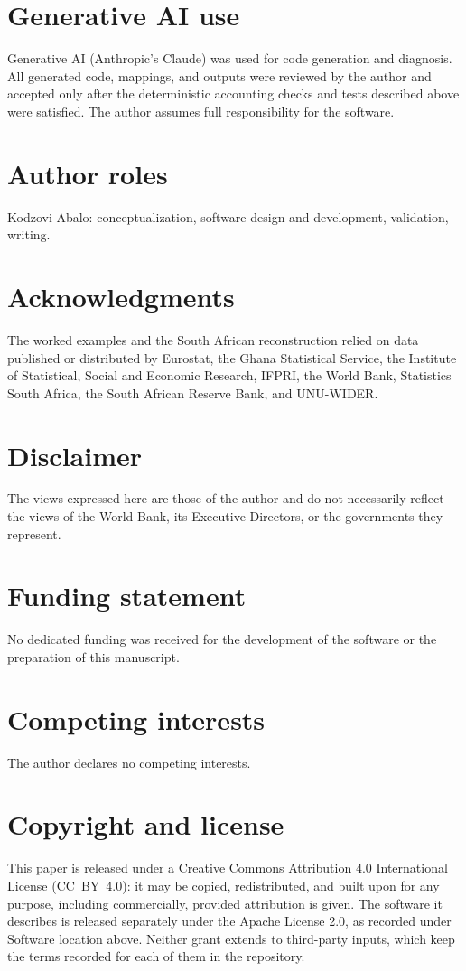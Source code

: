 \documentclass[11pt,a4paper]{article}
\begin{document}
\section*{Generative AI use}
Generative AI (Anthropic's Claude) was used for code generation and
diagnosis. All generated code, mappings, and outputs were reviewed by the
author and accepted only after the deterministic accounting checks and
tests described above were satisfied. The author assumes full
responsibility for the software.

\section*{Author roles}
Kodzovi Abalo: conceptualization, software design and development,
validation, writing.

\section*{Acknowledgments}
The worked examples and the South African reconstruction relied on data
published or distributed by Eurostat, the Ghana Statistical Service, the
Institute of Statistical, Social and Economic Research, IFPRI, the World
Bank, Statistics South Africa, the South African Reserve Bank, and
UNU-WIDER.

\section*{Disclaimer}
The views expressed here are those of the author and do not necessarily
reflect the views of the World Bank, its Executive Directors, or the
governments they represent.

\section*{Funding statement}
No dedicated funding was received for the development of the software or
the preparation of this manuscript.

\section*{Competing interests}
The author declares no competing interests.

\section*{Copyright and license}
This paper is released under a Creative Commons Attribution 4.0
International License (CC~BY~4.0): it may be copied, redistributed, and
built upon for any purpose, including commercially, provided attribution
is given. The software it describes is released separately under the
Apache License 2.0, as recorded under Software location above. Neither
grant extends to third-party inputs, which keep the terms recorded for
each of them in the repository.



\end{document}
